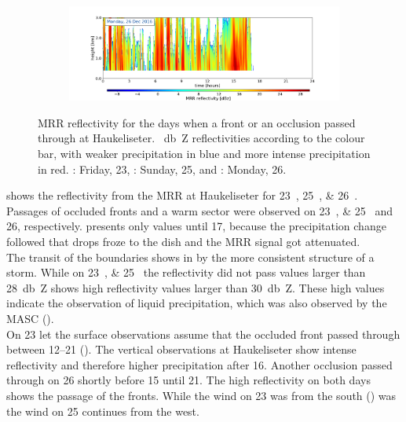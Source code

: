 \begin{figure}[h!]
\begin{subfigure}[t]{\textwidth}
		\caption{}\label{fig:ret:refl26}
    \end{subfigure}
    \begin{subfigure}[t]{\textwidth}
    	\includegraphics[trim={6.5cm 0cm 5.3cm 15.5cm},clip,width=\textwidth]{./fig_MRR_refl/MRR_20161226}
    \end{subfigure}
    \caption{MRR reflectivity for the days when a front or an occlusion passed through at Haukeliseter. \SI{}{\decibel Z} reflectivities according to the colour bar, with weaker precipitation in blue and more intense precipitation in red. \protect{}: Friday, \SI{23}{\dec}, \protect{}: Sunday, \SI{25}{\dec}, and \protect{}: Monday, \SI{26}{\dec}.}\label{fig:ret:refl}
\end{figure}
\noindent
{} shows the reflectivity from the MRR at Haukeliseter for \SIlist{23;25;26}{\dec}. Passages of occluded fronts and a warm sector were observed on \SIlist{23;25}{\dec} and \SI{26}{\dec}, respectively.  presents only values until \SI{17}{\UTC}, because the precipitation change followed that drops froze to the dish and the MRR signal got attenuated. 
\\
The transit of the boundaries shows in  by the more consistent structure of a storm. While on \SIlist{23;25}{\dec} the reflectivity did not pass values larger than \SI{28}{\decibel Z} shows  high reflectivity values larger than \SI{30}{\decibel Z}. These high values indicate the observation of liquid precipitation, which was also observed by the MASC (). 
\\
On \SI{23}{\dec} let the surface observations assume that the occluded front passed through between \SIrange{12}{21}{\UTC} (). The vertical observations at Haukeliseter show intense reflectivity and therefore higher precipitation after \SI{16}{\UTC}. Another occlusion passed through on \SI{26}{\dec} shortly before \SI{15}{\UTC} until \SI{21}{\UTC}. The high reflectivity on both days shows the passage of the fronts. While the wind on \SI{23}{\dec} was from the south () was the wind on \SI{25}{\dec} continues from the west. 
